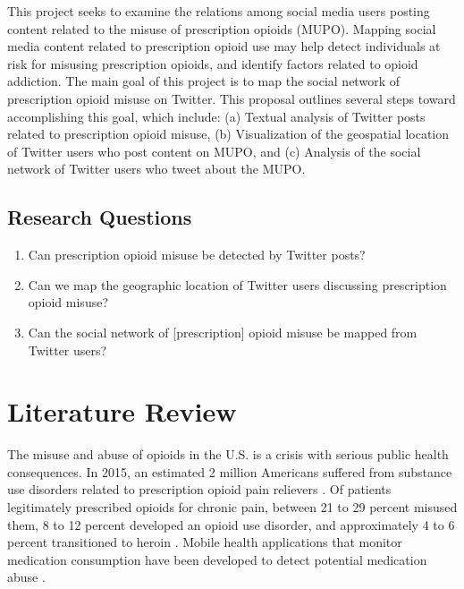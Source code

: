 \documentclass[sigconf]{acmart}
\begin{document}
This project seeks to examine the relations among social media users posting 
content related to the misuse of prescription opioids (MUPO). Mapping social 
media content related to prescription opioid use may help detect individuals 
at risk for misusing prescription opioids, and identify factors related to 
opioid addiction. The main goal of this project is to map the social network
of prescription opioid misuse on Twitter. This proposal outlines several steps 
toward accomplishing this goal, which include: (a) Textual analysis of Twitter 
posts related to prescription opioid misuse, (b) Visualization of the 
geospatial location of Twitter users who post content on MUPO, and (c) Analysis 
of the social network of Twitter users who tweet about the MUPO. 

\subsection{Research Questions} 
\begin{enumerate}
    \item Can prescription opioid misuse be detected by Twitter posts? 
    \item Can we map the geographic location of  Twitter users discussing 
    prescription opioid misuse? 
    \item Can the social network of [prescription] opioid misuse be mapped 
    from Twitter users?  
\end{enumerate}

\section{Literature Review} 

The misuse and abuse of opioids in the U.S. is a crisis with serious public 
health consequences. In 2015, an estimated 2 million Americans suffered from 
substance use disorders related to prescription opioid pain relievers 
\cite{nida18, cdc18}. Of patients legitimately prescribed opioids for chronic 
pain, between 21 to 29 percent misused them, 8 to 12 percent developed an 
opioid use disorder, and approximately 4 to 6 percent transitioned to heroin 
\cite{vowles15, carlson16}. Mobile health applications that monitor medication 
consumption have been developed to detect potential medication abuse 
\cite{varshney13}.
\end{document}
